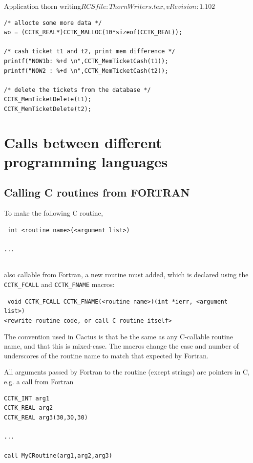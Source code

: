 \begin{cactuspart}{2}{Application thorn writing}{$RCSfile: ThornWriters.tex,v $}{$Revision: 1.102 $}
\begin{verbatim}
/* allocte some more data */
wo = (CCTK_REAL*)CCTK_MALLOC(10*sizeof(CCTK_REAL));
	
/* cash ticket t1 and t2, print mem difference */	
printf("NOW1b: %+d \n",CCTK_MemTicketCash(t1));
printf("NOW2 : %+d \n",CCTK_MemTicketCash(t2));

/* delete the tickets from the database */
CCTK_MemTicketDelete(t1);
CCTK_MemTicketDelete(t2);

\end{verbatim}




\section[Calls to different language]{Calls between different programming languages}

\subsection{Calling C routines from FORTRAN}
\label{sec:cacrofr}

To make the following C routine,

{\tt
int <routine name>(<argument list>)\\
{\\
...\\
}
}

also callable from Fortran, a new routine must added, which is
declared using the {\tt CCTK\_FCALL} and {\tt CCTK\_FNAME} macros:

{\tt
void CCTK\_FCALL CCTK\_FNAME(<routine name>)(int *ierr, <argument list>)\\
<rewrite routine code, or call C routine itself>
}

The convention used in Cactus is that {\tt <routine name>} be the same as any
C-callable routine name, and that this is mixed-case.  The macros change
the case and number of underscores of the routine name to match that expected
by Fortran.

All arguments passed by Fortran to the routine (except strings) are
pointers in C, e.g. a call from Fortran

\begin{verbatim}
CCTK_INT arg1
CCTK_REAL arg2
CCTK_REAL arg3(30,30,30)

...

call MyCRoutine(arg1,arg2,arg3)
\end{verbatim}


\end{cactuspart}
